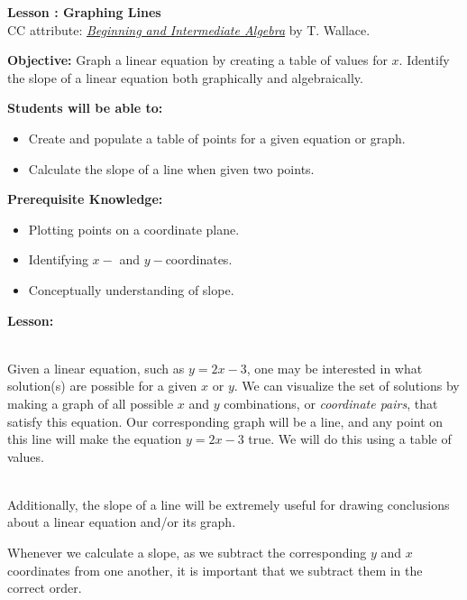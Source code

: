 \documentclass[12pt]{article}
\theoremstyle{definition}
\begin{document}
{\bf \large Lesson : Graphing Lines}\label{les:graphing_lines}
\\ CC attribute: \href{http://www.wallace.ccfaculty.org/book/book.html}{\it{Beginning and Intermediate Algebra}} by T. Wallace. 
\hfill \doclicenseImage[imagewidth=5em]\\
\par
{\bf Objective:} Graph a linear equation by creating a table of values for $x$.  Identify the slope of a linear equation both graphically and algebraically.\\
\par
{\bf Students will be able to:}
\begin{itemize}
	\item Create and populate a table of points for a given equation or graph.
	\item Calculate the slope of a line when given two points.
\end{itemize}
{\bf Prerequisite Knowledge:}
\begin{itemize}
	\item Plotting points on a coordinate plane.
	\item Identifying $x-$ and $y-$coordinates.
	\item Conceptually understanding of slope.
\end{itemize}
\hrulefill

{\bf Lesson:}\\
\ \par
Given a linear equation, such as $y = 2 x - 3$, one may be interested in what solution(s) are possible for a given $x$ or $y$.  We can visualize the set of solutions by making a graph of all possible $x$ and  $y$ combinations, or {\it coordinate pairs}, that satisfy this equation.  Our corresponding graph will be a line, and any point on this line will make the equation $y = 2 x - 3$ true.  We will do this using a table of values.\\
\ \par
Additionally, the slope of a line will be extremely useful for drawing conclusions about a linear equation and/or its graph.
\begin{center}
\end{center}
Whenever we calculate a slope, as we subtract the corresponding $y$ and $x$ coordinates from one another, it is important that we subtract them in the correct order.
\end{document}
